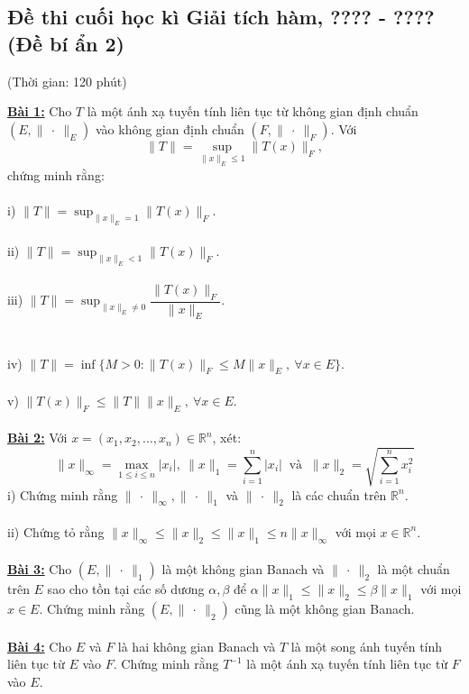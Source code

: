 \documentclass[10pt, a4paper]{article}
\begin{document}
\subsection{Đề thi cuối học kì Giải tích hàm, ???? - ???? (Đề bí ẩn 2)}
\begin{center}
	\color{blue}(Thời gian: 120 phút)
\end{center}
\color{red}\underline{\textbf{Bài 1:}} \color{black}Cho $T$ là một ánh xạ tuyến tính liên tục từ không gian định chuẩn $(E,\lVert~\cdot~\rVert_E)$ vào không gian định chuẩn $(F,\lVert~\cdot~\rVert_F)$. Với $$\lVert T\rVert=\displaystyle\sup_{\lVert x\rVert_E\le1}\lVert T(x)\rVert_F,$$ chứng minh rằng:\\\\
\color{red}i) \color{black}$\lVert T\rVert=\displaystyle\sup_{\lVert x\rVert_E=1}\lVert T(x)\rVert_F$.\\\\
\color{red}ii) \color{black}$\lVert T\rVert=\displaystyle\sup_{\lVert x\rVert_E<1}\lVert T(x)\rVert_F$.\\\\
\color{red}iii) \color{black}$\lVert T\rVert=\displaystyle\sup_{\lVert x\rVert_E\ne0}\dfrac{\lVert T(x)\rVert_F}{\lVert x\rVert_E}$.\\\\\\
\color{red}iv) \color{black}$\lVert T\rVert=\inf\{M>0:\lVert T(x)\rVert_F\le M\lVert x\rVert_E,~\forall x\in E\}$.\\\\
\color{red}v) \color{black}$\lVert T(x)\rVert_F\le\lVert T\rVert\lVert x\rVert_E,~\forall x\in E$.\\\\
\color{red}\underline{\textbf{Bài 2:}} \color{black}Với $x=(x_1,x_2,\ldots,x_n)\in\mathbb R^n$, xét: $$\lVert x\rVert_\infty=\displaystyle\max_{1\le i\le n}|x_i|,~\lVert x\rVert_1=\displaystyle\sum_{i=1}^n|x_i|~\text{ và }~\lVert x\rVert_2=\sqrt{\displaystyle\sum_{i=1}^nx_i^2}$$
\color{red}i) \color{black}Chứng minh rằng $\lVert~\cdot~\rVert_\infty,\lVert~\cdot~\rVert_1$ và $\lVert~\cdot~\rVert_2$ là các chuẩn trên $\mathbb R^n$.\\\\
\color{red}ii) \color{black}Chứng tỏ rằng $\lVert x\rVert_\infty\le\lVert x\rVert_2\le\lVert x\rVert_1\le n\lVert x\rVert_\infty$ với mọi $x\in\mathbb R^n$.\\\\
\color{red}\underline{\textbf{Bài 3:}} \color{black}Cho $(E,\lVert~\cdot~\rVert_1)$ là một không gian Banach và $\lVert~\cdot~\rVert_2$ là một chuẩn trên $E$ sao cho tồn tại các số dương $\alpha,\beta$ để $\alpha\lVert x\rVert_1\le\lVert x\rVert_2\le\beta\lVert x\rVert_1$ với mọi $x\in E$. Chứng minh rằng $(E,\lVert~\cdot~\rVert_2)$ cũng là một không gian Banach.\\\\
\color{red}\underline{\textbf{Bài 4:}} \color{black}Cho $E$ và $F$ là hai không gian Banach và $T$ là một song ánh tuyến tính liên tục từ $E$ vào $F$. Chứng minh rằng $T^{-1}$ là một ánh xạ tuyến tính liên tục từ $F$ vào $E$.
\newpage
\end{document}
